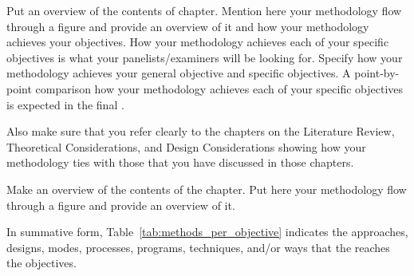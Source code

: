 Put an overview of the contents of chapter. Mention here your methodology flow through a figure and provide an overview of it and how your methodology achieves your objectives.  How your methodology achieves each of your specific objectives is what your panelists/examiners will be looking for.  Specify how your methodology achieves your general objective and specific objectives.  A point-by-point comparison how your methodology achieves each of your specific objectives is expected in the final \documentType.

Also make sure that you refer clearly to the chapters on the Literature Review, Theoretical Considerations, and Design Considerations showing how your methodology ties with those that you have discussed in those chapters.

Make an overview of the contents of the chapter. Put here your methodology flow through a figure and provide an overview of it.  


In summative form, Table~\ref{tab:methods_per_objective} indicates the approaches, designs, modes, processes, programs, techniques, and/or ways that the \documentType reaches the objectives. 


